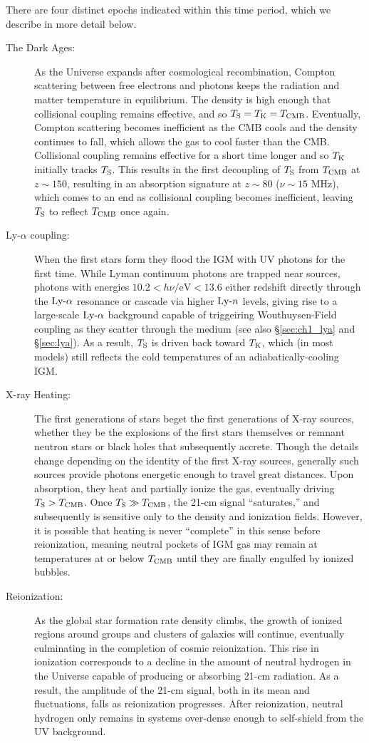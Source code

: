 There are four distinct epochs indicated within this time period, which we describe in more detail below.
\begin{description}
	\item[The Dark Ages:] As the Universe expands after cosmological recombination, Compton scattering between free electrons and photons keeps the radiation and matter temperature in equilibrium. The density is high enough that collisional coupling remains effective, and so $T_{\text{S}} = T_{\text{K}} = T_{\text{CMB}}$. Eventually, Compton scattering becomes inefficient as the CMB cools and the density continues to fall, which allows the gas to cool faster than the CMB. Collisional coupling remains effective for a short time longer and so $T_{\text{K}}$ initially tracks $T_{\text{S}}$. This results in the first decoupling of $T_{\text{S}}$ from $T_{\text{CMB}}$ at $z \sim 150$, resulting in an absorption signature at $z \sim 80$ ($\nu \sim 15$ MHz), which comes to an end as collisional coupling becomes inefficient, leaving $T_{\text{S}}$ to reflect $T_{\text{CMB}}$ once again.
	\item[Ly-$\alpha$ coupling:] When the first stars form they flood the IGM with UV photons for the first time. While Lyman continuum photons are trapped near sources, photons with energies $10.2 < h\nu / \mathrm{eV} < 13.6$ either redshift directly through the $\text{Ly-}\alpha$ resonance or cascade via higher $\text{Ly-}n$ levels, giving rise to a large-scale $\text{Ly-}\alpha$ background capable of triggeiring Wouthuysen-Field coupling as they scatter through the medium (see also \S\ref{sec:ch1_lya} and \S\ref{sec:lya}). As a result, $T_{\text{S}}$ is driven back toward $T_{\text{K}}$, which (in most models) still reflects the cold temperatures of an adiabatically-cooling IGM.
	\item[X-ray Heating:] The first generations of stars beget the first generations of X-ray sources, whether they be the explosions of the first stars themselves or remnant neutron stars or black holes that subsequently accrete. Though the details change depending on the identity of the first X-ray sources, generally such sources provide photons energetic enough to travel great distances. Upon absorption, they heat and partially ionize the gas, eventually driving $T_{\text{S}} > T_{\text{CMB}}$. Once $T_{\text{S}} \gg T_{\text{CMB}}$, the 21-cm signal ``saturates,'' and subsequently is sensitive only to the density and ionization fields. However, it is possible that heating is never ``complete'' in this sense before reionization, meaning neutral pockets of IGM gas may remain at temperatures at or below $T_{\text{CMB}}$ until they are finally engulfed by ionized bubbles.
	\item[Reionization:] As the global star formation rate density climbs, the growth of ionized regions around groups and clusters of galaxies will continue, eventually culminating in the completion of cosmic reionization. This rise in ionization corresponds to a decline in the amount of neutral hydrogen in the Universe capable of producing or absorbing 21-cm radiation. As a result, the amplitude of the 21-cm signal, both in its mean and fluctuations, falls as reionization progresses. After reionization, neutral hydrogen only remains in systems over-dense enough to self-shield from the UV background.
\end{description}

